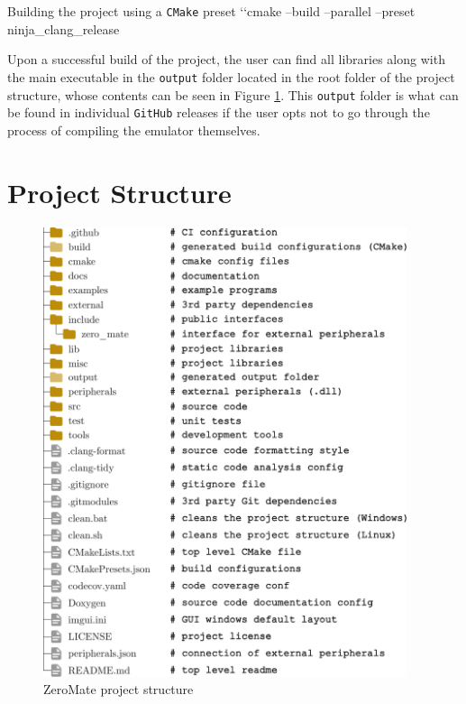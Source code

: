 \documentclass[english, ing, kiv, he, iso690numb, pdf]{fasthesis}
\begin{document}
\begin{console}{Building the project using a \texttt{CMake} preset\label{Building the project using a CMake preset}}
`\uxprompt`cmake --build --parallel --preset 
ninja_clang_release
\end{console}
	
	Upon a successful build of the project, the user can find all libraries along with the main executable in the \texttt{output} folder located in the root folder of the project structure, whose contents can be seen in Figure \ref{ZeroMate project structure}. This \texttt{output} folder is what can be found in individual \texttt{GitHub} releases if the user opts not to go through the process of compiling the emulator themselves.
	
	\newpage
	
	\section{Project Structure}
	
	\null
	\vfill
	
	\begin{figure}[ht]
		\centering
		\includegraphics[width=0.95\textwidth]{img/diagrams/project_structure.pdf}
		\caption{ZeroMate project structure}
		\label{ZeroMate project structure}
	\end{figure}
	
\end{document}
